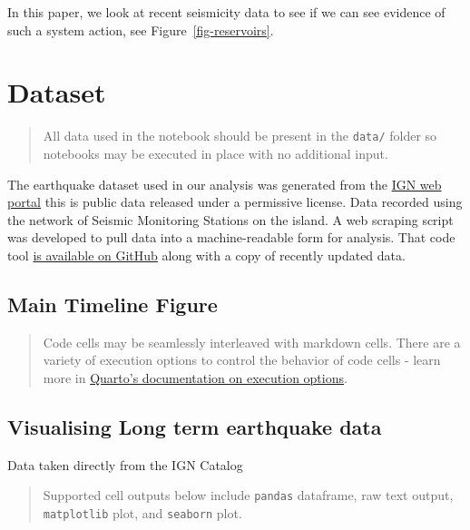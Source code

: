 \documentclass[
]{agujournal2019}
\begin{document}
In this paper, we look at recent seismicity data to see if we can see
evidence of such a system action, see Figure~\ref{fig-reservoirs}.

\hypertarget{dataset}{%
\section{Dataset}\label{dataset}}

\begin{quote}
All data used in the notebook should be present in the \texttt{data/}
folder so notebooks may be executed in place with no additional input.
\end{quote}

The earthquake dataset used in our analysis was generated from the
\href{https://www.ign.es/web/resources/volcanologia/tproximos/canarias.html}{IGN
web portal} this is public data released under a permissive license.
Data recorded using the network of Seismic Monitoring Stations on the
island. A web scraping script was developed to pull data into a
machine-readable form for analysis. That code tool
\href{https://github.com/stevejpurves/ign-earthquake-data}{is available
on GitHub} along with a copy of recently updated data.

\hypertarget{main-timeline-figure}{%
\subsection{Main Timeline Figure}\label{main-timeline-figure}}

\begin{quote}
Code cells may be seamlessly interleaved with markdown cells. There are
a variety of execution options to control the behavior of code cells -
learn more in
\href{https://quarto.org/docs/computations/execution-options.html}{Quarto's
documentation on execution options}.
\end{quote}

\hypertarget{visualising-long-term-earthquake-data}{%
\subsection{Visualising Long term earthquake
data}\label{visualising-long-term-earthquake-data}}

Data taken directly from the IGN Catalog

\begin{quote}
Supported cell outputs below include \texttt{pandas} dataframe, raw text
output, \texttt{matplotlib} plot, and \texttt{seaborn} plot.
\end{quote}
\end{document}
